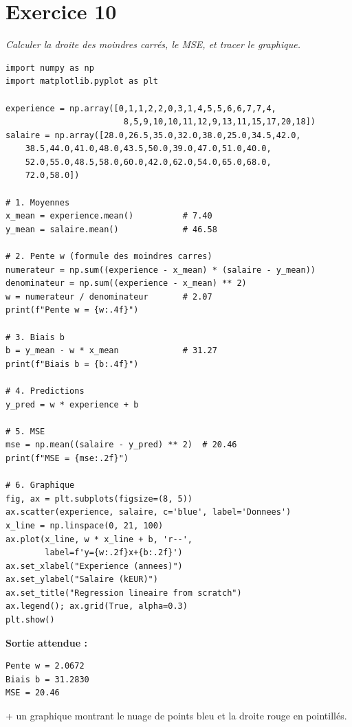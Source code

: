 \section*{Exercice 10 \hfill \exointermediaire}
\textit{Calculer la droite des moindres carr\'{e}s, le MSE, et tracer le graphique.}

\separateur

\begin{pythonbox}
\begin{lstlisting}
import numpy as np
import matplotlib.pyplot as plt

experience = np.array([0,1,1,2,2,0,3,1,4,5,5,6,6,7,7,4,
                        8,5,9,10,10,11,12,9,13,11,15,17,20,18])
salaire = np.array([28.0,26.5,35.0,32.0,38.0,25.0,34.5,42.0,
    38.5,44.0,41.0,48.0,43.5,50.0,39.0,47.0,51.0,40.0,
    52.0,55.0,48.5,58.0,60.0,42.0,62.0,54.0,65.0,68.0,
    72.0,58.0])

# 1. Moyennes
x_mean = experience.mean()          # 7.40
y_mean = salaire.mean()             # 46.58

# 2. Pente w (formule des moindres carres)
numerateur = np.sum((experience - x_mean) * (salaire - y_mean))
denominateur = np.sum((experience - x_mean) ** 2)
w = numerateur / denominateur       # 2.07
print(f"Pente w = {w:.4f}")

# 3. Biais b
b = y_mean - w * x_mean             # 31.27
print(f"Biais b = {b:.4f}")

# 4. Predictions
y_pred = w * experience + b

# 5. MSE
mse = np.mean((salaire - y_pred) ** 2)  # 20.46
print(f"MSE = {mse:.2f}")

# 6. Graphique
fig, ax = plt.subplots(figsize=(8, 5))
ax.scatter(experience, salaire, c='blue', label='Donnees')
x_line = np.linspace(0, 21, 100)
ax.plot(x_line, w * x_line + b, 'r--',
        label=f'y={w:.2f}x+{b:.2f}')
ax.set_xlabel("Experience (annees)")
ax.set_ylabel("Salaire (kEUR)")
ax.set_title("Regression lineaire from scratch")
ax.legend(); ax.grid(True, alpha=0.3)
plt.show()
\end{lstlisting}
\end{pythonbox}

\textbf{Sortie attendue :}
\begin{verbatim}
Pente w = 2.0672
Biais b = 31.2830
MSE = 20.46
\end{verbatim}
+ un graphique montrant le nuage de points bleu et la droite rouge en pointill\'{e}s.

